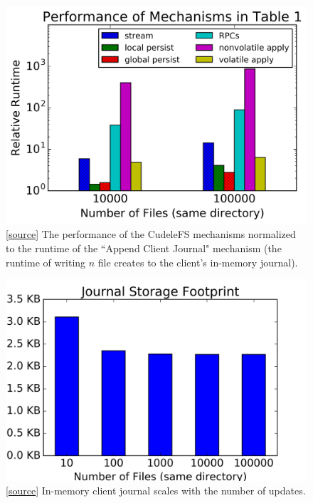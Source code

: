 \begin{figure}[tb]
\centering
\includegraphics[width=1.0\linewidth]{graphs/slowdown-mechanisms.png}
\caption{
[\href{https://...}{source}]
The performance of the CudeleFS mechanisms normalized to the runtime of the
``Append Client Journal" mechanism (the runtime of writing \(n\) file creates
to the client's in-memory journal).  \label{fig:slowdown-mechanisms}}
\end{figure}

\begin{figure}[tb]
\centering
\includegraphics[width=1.0\linewidth]{graphs/behavior-journal-size.png}
\caption{
[\href{https://...}{source}]
In-memory client journal scales with the number of
updates.\label{fig:behavior-journal-size}}
\end{figure}

